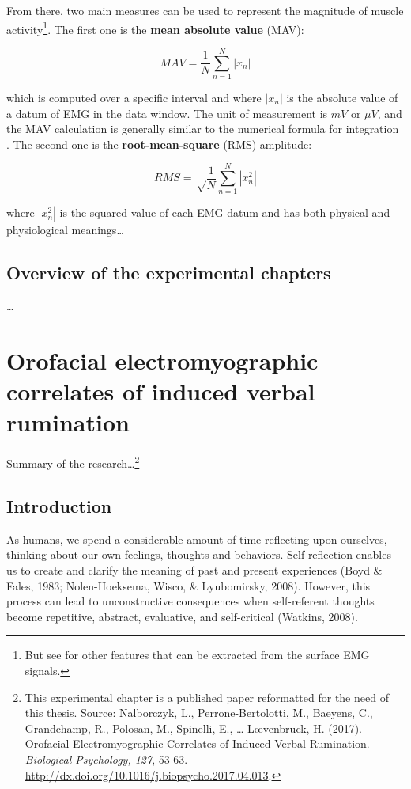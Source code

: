 \documentclass[12pt,]{book}
\let\rmarkdownfootnote\footnote%
\def\footnote{\protect\rmarkdownfootnote}
\theoremstyle{definition}
\theoremstyle{definition}
\theoremstyle{definition}
\theoremstyle{remark}
\begin{document}
From there, two main measures can be used to represent the magnitude of
muscle activity\footnote{But see \citet{phinyomark_feature_2012} for
  other features that can be extracted from the surface EMG signals.}.
The first one is the \textbf{mean absolute value} (MAV):

\[MAV = \frac{1}{N} \sum_{n=1}^{N} | x_{n} |\]

which is computed over a specific interval and where \(|x_{n}|\) is the
absolute value of a datum of EMG in the data window. The unit of
measurement is \(mV\) or \(\mu V\), and the MAV calculation is generally
similar to the numerical formula for integration
\citep{kamen_essentials_2010}. The second one is the
\textbf{root-mean-square} (RMS) amplitude:

\[RMS = \sqrt \frac{1}{N} \sum_{n=1}^{N} | x^{2}_{n} |\]

where \(| x^{2}_{n} |\) is the squared value of each EMG datum and has
both physical and physiological meanings\ldots{}

\section{Overview of the experimental
chapters}\label{overview-of-the-experimental-chapters}

\ldots{}

\chapter{Orofacial electromyographic correlates of induced verbal
rumination}\label{orofacial-electromyographic-correlates-of-induced-verbal-rumination}

Summary of the research\ldots{}\footnote{This experimental chapter is a
  published paper reformatted for the need of this thesis. Source:
  Nalborczyk, L., Perrone-Bertolotti, M., Baeyens, C., Grandchamp, R.,
  Polosan, M., Spinelli, E., \ldots{} L\oe venbruck, H. (2017).
  Orofacial Electromyographic Correlates of Induced Verbal Rumination.
  \emph{Biological Psychology, 127}, 53-63.
  \url{http://dx.doi.org/10.1016/j.biopsycho.2017.04.013}.}

\section{Introduction}\label{introduction}

As humans, we spend a considerable amount of time reflecting upon
ourselves, thinking about our own feelings, thoughts and behaviors.
Self-reflection enables us to create and clarify the meaning of past and
present experiences (Boyd \& Fales, 1983; Nolen-Hoeksema, Wisco, \&
Lyubomirsky, 2008). However, this process can lead to unconstructive
consequences when self-referent thoughts become repetitive, abstract,
evaluative, and self-critical (Watkins, 2008).
\end{document}
